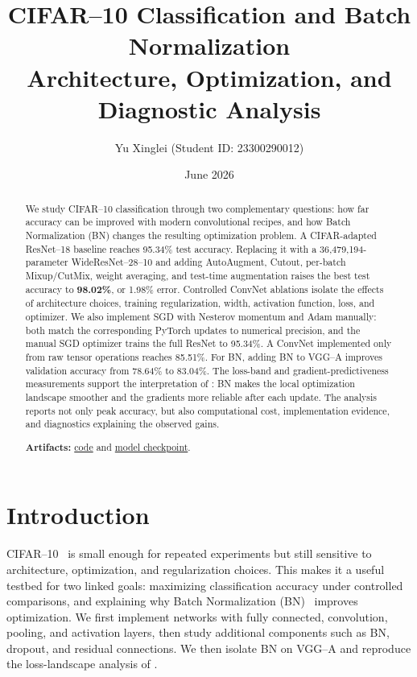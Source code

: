 \documentclass[11pt]{article}
\title{\textbf{CIFAR--10 Classification and Batch Normalization}\\[4pt]
\large Architecture, Optimization, and Diagnostic Analysis}
\author{Yu Xinglei \quad (Student ID: 23300290012)}
\date{June 2026}
\newcommand{\bestAcc}{98.02}     %
\newcommand{\bestErr}{1.98}      %
\newcommand{\bestParams}{36{,}479{,}194}
\newcommand{\baseAcc}{95.34}     %
\newcommand{\manualAcc}{95.34}   %
\newcommand{\manualNetAcc}{85.51} %
\newcommand{\bnStdAcc}{78.64}    %
\newcommand{\bnBnAcc}{83.04}     %
\begin{document}
\maketitle

\begin{abstract}
We study CIFAR--10 classification through two complementary questions:
how far accuracy can be improved with modern convolutional recipes, and how
Batch Normalization (BN) changes the resulting optimization problem. A
CIFAR-adapted ResNet--18 baseline reaches \baseAcc\% test accuracy. Replacing
it with a \bestParams{}-parameter WideResNet--28--10 and adding AutoAugment,
Cutout, per-batch Mixup/CutMix, weight averaging, and test-time augmentation
raises the best test accuracy to \textbf{\bestAcc\%}, or \bestErr\% error.
Controlled ConvNet ablations isolate the effects of architecture choices,
training regularization, width, activation function, loss, and optimizer. We
also implement SGD with Nesterov momentum and Adam manually: both match the
corresponding PyTorch updates to numerical precision, and the manual SGD
optimizer trains the full ResNet to \manualAcc\%. A ConvNet implemented only
from raw tensor operations reaches \manualNetAcc\%. For BN, adding BN to
VGG--A improves validation accuracy from \bnStdAcc\% to \bnBnAcc\%. The
loss-band and gradient-predictiveness measurements support the interpretation
of \citet{santurkar2018how}: BN makes the local optimization landscape smoother
and the gradients more reliable after each update. The analysis reports not
only peak accuracy, but also computational cost, implementation evidence, and
diagnostics explaining the observed gains.

\smallskip
\noindent\textbf{Artifacts:} \href{https://github.com/spoil-ed/Neural-Network-and-Deep-Learning-PJ2}{code} and
\href{https://www.modelscope.cn/models/imspoiled/Neural-Network-and-Deep-Learning-PJ2-Checkpoin}{model checkpoint}.
\end{abstract}

\section{Introduction}
CIFAR--10~\citep{krizhevsky2009learning} is small enough for repeated
experiments but still sensitive to architecture, optimization, and
regularization choices. This makes it a useful testbed for two linked goals:
maximizing classification accuracy under controlled comparisons, and explaining
why Batch Normalization (BN)~\citep{ioffe2015batch} improves optimization.
We first implement networks with fully connected, convolution, pooling, and
activation layers, then study additional components such as BN, dropout, and
residual connections. We then isolate BN on VGG--A and reproduce the
loss-landscape analysis of \citet{santurkar2018how}.
\end{document}

